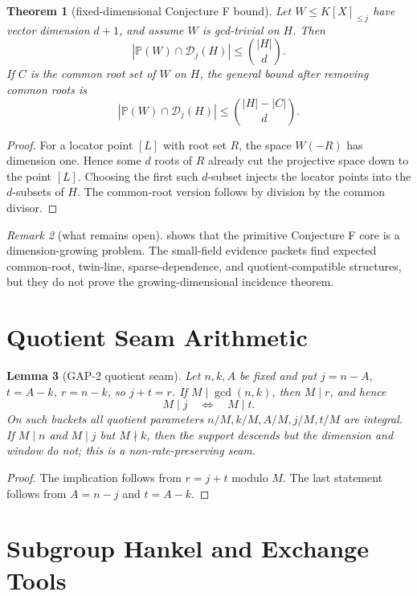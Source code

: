 \documentclass[11pt]{article}
\newtheorem{theorem}{Theorem}[section]
\newtheorem{lemma}[theorem]{Lemma}
\theoremstyle{definition}
\theoremstyle{remark}
\newtheorem{remark}[theorem]{Remark}
\newcommand{\D}{\mathcal D}
\newcommand{\PP}{\mathbb P}
\begin{document}
\begin{theorem}[fixed-dimensional Conjecture F bound]\label{thm:fixeddim}
Let $W\le K[X]_{\le j}$ have vector dimension $d+1$, and assume $W$ is
gcd-trivial on $H$.  Then
\[
        |\PP(W)\cap \D_j(H)|\le \binom{|H|}{d}.
\]
If $C$ is the common root set of $W$ on $H$, the general bound after removing
common roots is
\[
        |\PP(W)\cap \D_j(H)|\le \binom{|H|-|C|}{d}.
\]
\end{theorem}

\begin{proof}
For a locator point $[L]$ with root set $R$, the space $W(-R)$ has dimension
one.  Hence some $d$ roots of $R$ already cut the projective space down to the
point $[L]$.  Choosing the first such $d$-subset injects the locator points
into the $d$-subsets of $H$.  The common-root version follows by division by
the common divisor.
\end{proof}

\begin{remark}[what remains open]
 shows that the primitive Conjecture F core is a
dimension-growing problem.  The small-field evidence packets find expected
common-root, twin-line, sparse-dependence, and quotient-compatible structures,
but they do not prove the growing-dimensional incidence theorem.
\end{remark}

\section{Quotient Seam Arithmetic}

\begin{lemma}[GAP-2 quotient seam]\label{lem:gap2}
Let $n,k,A$ be fixed and put $j=n-A$, $t=A-k$, $r=n-k$, so $j+t=r$.  If
$M\mid\gcd(n,k)$, then $M\mid r$, and hence
\[
        M\mid j \quad\Longleftrightarrow\quad M\mid t.
\]
On such buckets all quotient parameters $n/M,k/M,A/M,j/M,t/M$ are integral.
If $M\mid n$ and $M\mid j$ but $M\nmid k$, then the support descends but the
dimension and window do not; this is a non-rate-preserving seam.
\end{lemma}

\begin{proof}
The implication follows from $r=j+t$ modulo $M$.  The last statement follows
from $A=n-j$ and $t=A-k$.
\end{proof}

\section{Subgroup Hankel and Exchange Tools}
\end{document}
